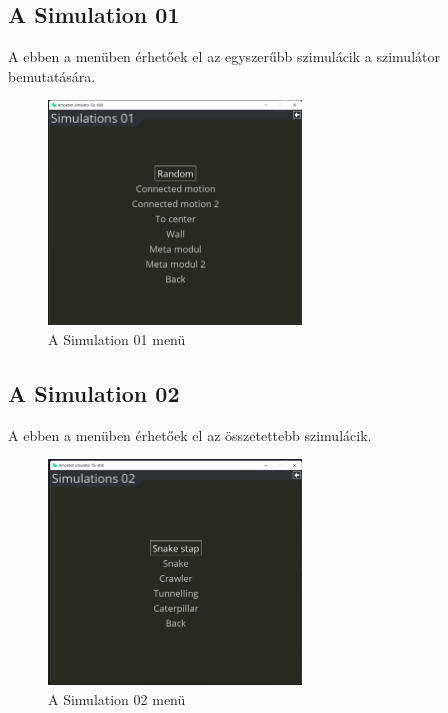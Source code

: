 \documentclass[	
  noindent
]{elteikthesis}[2024/04/26]
\begin{document}
        \subsection{A Simulation 01}
        A ebben a menüben érhetőek el az egyszerűbb szimulácik a szimulátor bemutatására.

        \begin{figure}[H]
          \centering
          \includegraphics[width=0.6\textwidth]{images/simulatons/Simulation01.png}
          \caption{A Simulation 01 menü}
          \label{fig:Simulation01}
        \end{figure}

        \subsection{A Simulation 02}
        A ebben a menüben érhetőek el az összetettebb szimulácik.

        \begin{figure}[H]
          \centering
          \includegraphics[width=0.6\textwidth]{images/simulatons/Simulation02.png}
          \caption{A Simulation 02 menü}
          \label{fig:Simulation01}
        \end{figure}
\end{document}
